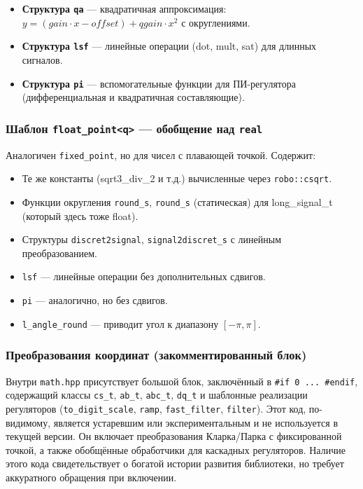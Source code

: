\documentclass[a4paper,12pt]{article}
\begin{document}
\begin{itemize}
\begin{itemize}
            \item \texttt{s\_mult(x1, x2)} — умножение двух Q15 с возвратом Q15.
            \item \texttt{s\_dot(x1,y1,x2,y2)} — скалярное произведение.
            \item \texttt{s\_fma(a,b,c)} — fused multiply-add.
        \end{itemize}
    \item \textbf{Структура \texttt{qa}} — квадратичная аппроксимация: $y = (gain \cdot x - offset) + qgain \cdot x^2$ с округлениями.
    \item \textbf{Структура \texttt{lsf}} — линейные операции (dot, mult, sat) для длинных сигналов.
    \item \textbf{Структура \texttt{pi}} — вспомогательные функции для ПИ-регулятора (дифференциальная и квадратичная составляющие).
\end{itemize}

\subsubsection{Шаблон \texttt{float\_point<q>} — обобщение над \texttt{real}}

Аналогичен \texttt{fixed\_point}, но для чисел с плавающей точкой. Содержит:
\begin{itemize}
    \item Те же константы (sqrt3\_div\_2 и т.д.) вычисленные через \texttt{robo::csqrt}.
    \item Функции округления \texttt{round\_s}, \texttt{round\_s} (статическая) для long\_signal\_t (который здесь тоже float).
    \item Структуры \texttt{discret2signal}, \texttt{signal2discret\_s} с линейным преобразованием.
    \item \texttt{lsf} — линейные операции без дополнительных сдвигов.
    \item \texttt{pi} — аналогично, но без сдвигов.
    \item \texttt{l\_angle\_round} — приводит угол к диапазону $[-\pi, \pi]$.
\end{itemize}

\subsubsection{Преобразования координат (закомментированный блок)}

Внутри \texttt{math.hpp} присутствует большой блок, заключённый в \texttt{\#if 0 ... \#endif}, содержащий классы \texttt{cs\_t}, \texttt{ab\_t}, \texttt{abc\_t}, \texttt{dq\_t} и шаблонные реализации регуляторов (\texttt{to\_digit\_scale}, \texttt{ramp}, \texttt{fast\_filter}, \texttt{filter}). Этот код, по-видимому, является устаревшим или экспериментальным и не используется в текущей версии. Он включает преобразования Кларка/Парка с фиксированной точкой, а также обобщённые обработчики для каскадных регуляторов. Наличие этого кода свидетельствует о богатой истории развития библиотеки, но требует аккуратного обращения при включении.
\end{document}
